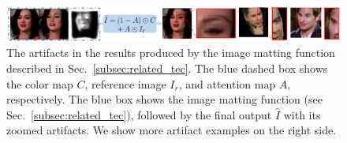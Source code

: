 \documentclass[runningheads]{llncs}
\def\mathbi#1{\textbf{\em #1}}
\begin{document}

\begin{figure}[t]
\includegraphics[width= \linewidth]{latex/images/artifact.png}
\centering
\caption{The artifacts in the results produced by the image matting function described in Sec.~\ref{subsec:related_tec}. The blue dashed box shows the color map $C$, reference image $I_r$, and attention map $A$, respectively. The blue box shows the image matting function (see Sec.~\ref{subsec:related_tec}), followed by the final output $\hat{I}$ with its zoomed artifacts. We show more artifact examples on the right side.}
\vspace{-5mm}
\label{fig:composite}
\end{figure}
\end{document}
